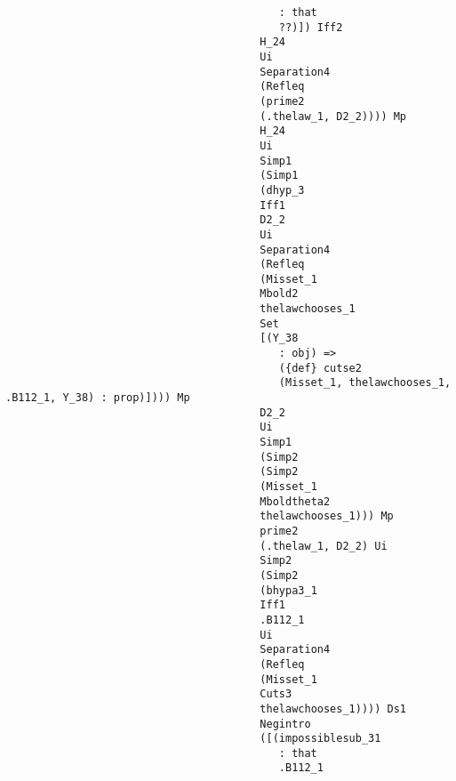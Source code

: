 \documentclass[12pt]{article}
\begin{document}
\begin{verbatim}
                                           : that 
                                           ??)]) Iff2 
                                        H_24 
                                        Ui 
                                        Separation4 
                                        (Refleq 
                                        (prime2 
                                        (.thelaw_1, D2_2)))) Mp 
                                        H_24 
                                        Ui 
                                        Simp1 
                                        (Simp1 
                                        (dhyp_3 
                                        Iff1 
                                        D2_2 
                                        Ui 
                                        Separation4 
                                        (Refleq 
                                        (Misset_1 
                                        Mbold2 
                                        thelawchooses_1 
                                        Set 
                                        [(Y_38 
                                           : obj) => 
                                           ({def} cutse2 
                                           (Misset_1, thelawchooses_1, .B112_1, Y_38) : prop)]))) Mp 
                                        D2_2 
                                        Ui 
                                        Simp1 
                                        (Simp2 
                                        (Simp2 
                                        (Misset_1 
                                        Mboldtheta2 
                                        thelawchooses_1))) Mp 
                                        prime2 
                                        (.thelaw_1, D2_2) Ui 
                                        Simp2 
                                        (Simp2 
                                        (bhypa3_1 
                                        Iff1 
                                        .B112_1 
                                        Ui 
                                        Separation4 
                                        (Refleq 
                                        (Misset_1 
                                        Cuts3 
                                        thelawchooses_1)))) Ds1 
                                        Negintro 
                                        ([(impossiblesub_31 
                                           : that 
                                           .B112_1 

\end{verbatim}
\end{document}
